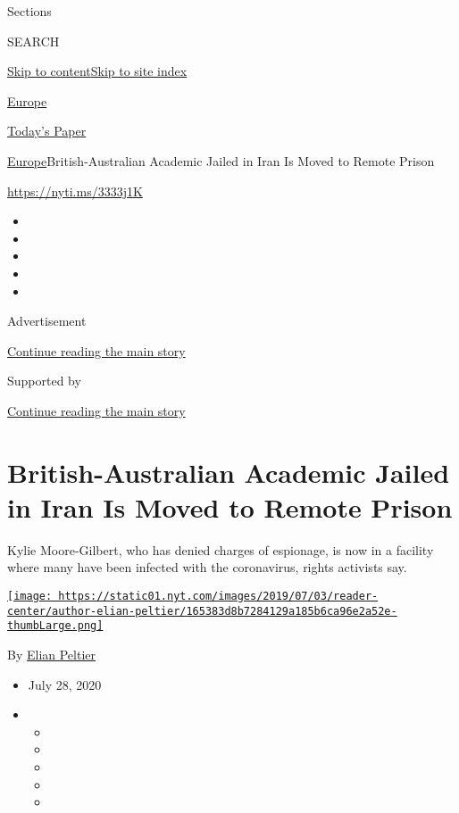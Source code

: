 Sections

SEARCH

\protect\hyperlink{site-content}{Skip to
content}\protect\hyperlink{site-index}{Skip to site index}

\href{https://www.nytimes.com/section/world/europe}{Europe}

\href{https://myaccount.nytimes.com/auth/login?response_type=cookie\&client_id=vi}{}

\href{https://www.nytimes.com/section/todayspaper}{Today's Paper}

\href{/section/world/europe}{Europe}\textbar{}British-Australian
Academic Jailed in Iran Is Moved to Remote Prison

\url{https://nyti.ms/3333j1K}

\begin{itemize}
\item
\item
\item
\item
\item
\end{itemize}

Advertisement

\protect\hyperlink{after-top}{Continue reading the main story}

Supported by

\protect\hyperlink{after-sponsor}{Continue reading the main story}

\hypertarget{british-australian-academic-jailed-in-iran-is-moved-to-remote-prison}{%
\section{British-Australian Academic Jailed in Iran Is Moved to Remote
Prison}\label{british-australian-academic-jailed-in-iran-is-moved-to-remote-prison}}

Kylie Moore-Gilbert, who has denied charges of espionage, is now in a
facility where many have been infected with the coronavirus, rights
activists say.

\href{https://www.nytimes.com/by/elian-peltier}{\texttt{[image: https://static01.nyt.com/images/2019/07/03/reader-center/author-elian-peltier/165383d8b7284129a185b6ca96e2a52e-thumbLarge.png]}}

By \href{https://www.nytimes.com/by/elian-peltier}{Elian Peltier}

\begin{itemize}
\item
  July 28, 2020
\item
  \begin{itemize}
  \item
  \item
  \item
  \item
  \item
  \end{itemize}
\end{itemize}

